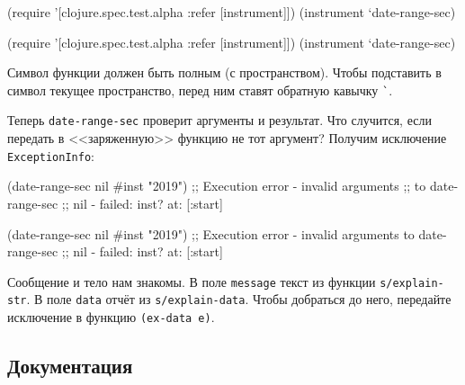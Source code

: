 \begin{english}
  \begin{clojure}
(require '[clojure.spec.test.alpha
           :refer [instrument]])
(instrument `date-range-sec)
  \end{clojure}
\end{english}

\else

\begin{english}
  \begin{clojure}
(require '[clojure.spec.test.alpha :refer [instrument]])
(instrument `date-range-sec)
  \end{clojure}
\end{english}

\fi


Символ функции должен быть полным (с пространством). Чтобы подставить в символ
текущее пространство, перед ним ставят обратную кавычку \verb|`|.

Теперь \verb|date-range-sec| проверит аргументы и результат. Что случится,
если передать в <<заряженную>> функцию не тот аргумент? Получим исключение
\verb|ExceptionInfo|:

\ifx\devicetype\mobile

\begin{english}
  \begin{clojure}
(date-range-sec nil #inst "2019")
;; Execution error - invalid arguments
;; to date-range-sec
;; nil - failed: inst? at: [:start]
  \end{clojure}
\end{english}

\else

\begin{english}
  \begin{clojure}
(date-range-sec nil #inst "2019")
;; Execution error - invalid arguments to date-range-sec
;; nil - failed: inst? at: [:start]
  \end{clojure}
\end{english}

\fi


Сообщение и тело нам знакомы. В поле \verb|message| текст из функции
\verb|s/explain-str|. В поле \verb|data| отчёт из
\verb|s/explain-data|. Чтобы добраться до него, передайте исключение в функцию
\verb|(ex-data e)|.

\subsection{Документация}

